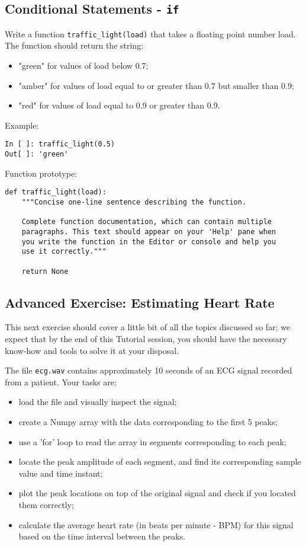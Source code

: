 \subsection{Conditional Statements - {\tt if}}

Write a function {\tt traffic\_light(load)} that takes a floating point number load. The function should return the string:

\begin{itemize}
	\item "green" for values of load below 0.7;
	\item "amber" for values of load equal to or greater than 0.7 but smaller than 0.9;
	\item "red" for values of load equal to 0.9 or greater than 0.9.
\end{itemize}

Example:

\begin{lstlisting}[frame=single]
In [ ]: traffic_light(0.5)
Out[ ]: 'green'
\end{lstlisting}

Function prototype:

\begin{lstlisting}[frame=single]
def traffic_light(load):
    """Concise one-line sentence describing the function.

    Complete function documentation, which can contain multiple
    paragraphs. This text should appear on your 'Help' pane when
    you write the function in the Editor or console and help you
    use it correctly."""

    return None
\end{lstlisting}

\subsection{Advanced Exercise: Estimating Heart Rate}

This next exercise should cover a little bit of all the topics discussed so far; we expect that by the end of this Tutorial session, you should have the necessary know-how and tools to solve it at your disposal.

The file {\tt ecg.wav} contains approximately 10 seconds of an ECG signal recorded from a patient. Your tasks are:

\begin{itemize}
	\item load the file and visually inspect the signal;
	\item create a Numpy array with the data corresponding to the first 5 peaks;
	\item use a 'for' loop to read the array in segments corresponding to each peak;
	\item locate the peak amplitude of each segment, and find its corresponding sample value and time instant;
	\item plot the peak locations on top of the original signal and check if you located them correctly;
	\item calculate the average heart rate (in beats per minute - BPM) for this signal based on the time interval between the peaks.
\end{itemize}


